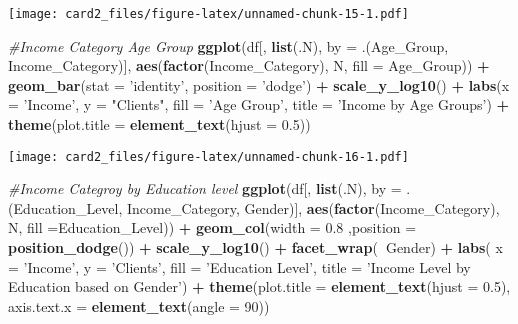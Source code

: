 \documentclass[]{article}
\newenvironment{Shaded}{\begin{snugshade}}{\end{snugshade}}
\newcommand{\CommentTok}[1]{\textcolor[rgb]{0.56,0.35,0.01}{\textit{#1}}}
\newcommand{\DataTypeTok}[1]{\textcolor[rgb]{0.13,0.29,0.53}{#1}}
\newcommand{\DecValTok}[1]{\textcolor[rgb]{0.00,0.00,0.81}{#1}}
\newcommand{\FloatTok}[1]{\textcolor[rgb]{0.00,0.00,0.81}{#1}}
\newcommand{\KeywordTok}[1]{\textcolor[rgb]{0.13,0.29,0.53}{\textbf{#1}}}
\newcommand{\NormalTok}[1]{#1}
\newcommand{\OperatorTok}[1]{\textcolor[rgb]{0.81,0.36,0.00}{\textbf{#1}}}
\newcommand{\StringTok}[1]{\textcolor[rgb]{0.31,0.60,0.02}{#1}}
\begin{document}
\texttt{[image: card2\_files/figure-latex/unnamed-chunk-15-1.pdf]}

\begin{Shaded}
\begin{Highlighting}[]
\CommentTok{#Income Category Age Group}
\KeywordTok{ggplot}\NormalTok{(df[, }\KeywordTok{list}\NormalTok{(.N), }\DataTypeTok{by =}\NormalTok{ .(Age_Group, Income_Category)], }\KeywordTok{aes}\NormalTok{(}\KeywordTok{factor}\NormalTok{(Income_Category), N, }\DataTypeTok{fill =}\NormalTok{ Age_Group)) }\OperatorTok{+}
\StringTok{  }\KeywordTok{geom_bar}\NormalTok{(}\DataTypeTok{stat =} \StringTok{'identity'}\NormalTok{, }\DataTypeTok{position =} \StringTok{'dodge'}\NormalTok{) }\OperatorTok{+}\StringTok{ }
\StringTok{  }\KeywordTok{scale_y_log10}\NormalTok{() }\OperatorTok{+}\StringTok{ }\KeywordTok{labs}\NormalTok{(}\DataTypeTok{x =} \StringTok{'Income'}\NormalTok{, }\DataTypeTok{y =} \StringTok{"Clients"}\NormalTok{, }\DataTypeTok{fill =} \StringTok{'Age Group'}\NormalTok{, }\DataTypeTok{title =} \StringTok{'Income by Age Groups'}\NormalTok{) }\OperatorTok{+}\StringTok{ }
\StringTok{  }\KeywordTok{theme}\NormalTok{(}\DataTypeTok{plot.title =} \KeywordTok{element_text}\NormalTok{(}\DataTypeTok{hjust =} \FloatTok{0.5}\NormalTok{))}
\end{Highlighting}
\end{Shaded}

\texttt{[image: card2\_files/figure-latex/unnamed-chunk-16-1.pdf]}

\begin{Shaded}
\begin{Highlighting}[]
\CommentTok{#Income Categroy by Education level }
\KeywordTok{ggplot}\NormalTok{(df[, }\KeywordTok{list}\NormalTok{(.N), }\DataTypeTok{by =}\NormalTok{ .(Education_Level, Income_Category, Gender)], }\KeywordTok{aes}\NormalTok{(}\KeywordTok{factor}\NormalTok{(Income_Category), N, }\DataTypeTok{fill =}\NormalTok{Education_Level)) }\OperatorTok{+}\StringTok{ }\KeywordTok{geom_col}\NormalTok{(}\DataTypeTok{width =} \FloatTok{0.8}\NormalTok{ ,}\DataTypeTok{position =} \KeywordTok{position_dodge}\NormalTok{()) }\OperatorTok{+}\StringTok{ }\KeywordTok{scale_y_log10}\NormalTok{() }\OperatorTok{+}\StringTok{ }\KeywordTok{facet_wrap}\NormalTok{(}\OperatorTok{~}\NormalTok{Gender) }\OperatorTok{+}\StringTok{ }
\StringTok{  }\KeywordTok{labs}\NormalTok{( }\DataTypeTok{x =} \StringTok{'Income'}\NormalTok{, }\DataTypeTok{y =} \StringTok{'Clients'}\NormalTok{, }\DataTypeTok{fill =} \StringTok{'Education Level'}\NormalTok{, }\DataTypeTok{title =} \StringTok{'Income Level by Education based on Gender'}\NormalTok{) }\OperatorTok{+}
\StringTok{  }\KeywordTok{theme}\NormalTok{(}\DataTypeTok{plot.title =} \KeywordTok{element_text}\NormalTok{(}\DataTypeTok{hjust =} \FloatTok{0.5}\NormalTok{), }\DataTypeTok{axis.text.x =} \KeywordTok{element_text}\NormalTok{(}\DataTypeTok{angle =} \DecValTok{90}\NormalTok{))}
\end{Highlighting}
\end{Shaded}
\end{document}
